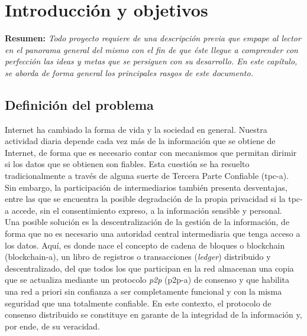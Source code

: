 \documentclass[12pt,a4paper, twoside]{report}
\begin{document}
	\setlength{\headwidth}{17.5cm}
	\renewcommand{\headrulewidth}{1.3pt}
	\setlength{\headsep}{1.1cm}
	
	\chapter{Introducción y objetivos} \label{introductionChapter}
		
	
	\textbf{Resumen:} \textit{Todo proyecto requiere de una descripción previa que empape al lector en el panorama general del mismo con el fin de que éste llegue a comprender con perfección las ideas y metas que se persiguen con su desarrollo. En este capítulo, se aborda de forma general los principales rasgos de este documento.}
		
	\section{Definición del problema}
		
	Internet ha cambiado la forma de vida y la sociedad en general. Nuestra actividad diaria depende cada vez más de la información que se obtiene de Internet, de forma que es necesario contar con mecanismos que permitan dirimir si los datos que se obtienen son fiables. Esta cuestión se ha resuelto tradicionalmente a través de alguna suerte de Tercera Parte Confiable (\gls{tpc-a}). Sin embargo, la participación de intermediarios también presenta desventajas, entre las que se encuentra la posible degradación de la propia privacidad si la \gls{tpc-a} accede, sin el consentimiento expreso, a la información sensible y personal. \\
	
	Una posible solución es la descentralización de la gestión de la información, de forma que no es necesario una autoridad central intermediaria que tenga acceso a los datos. Aquí, es donde nace el concepto de cadena de bloques o \Gls{blockchain} (\gls{blockchain-a}), un libro de registros o transacciones (\textit{ledger}) distribuido y descentralizado, del que todos los que participan en la red almacenan una copia que se actualiza mediante un protocolo \textit{\gls{p2p}} (\gls{p2p-a}) de consenso y que habilita una red a priori sin confianza a ser completamente funcional y con la misma seguridad que una totalmente confiable. En este contexto, el protocolo de consenso distribuido se constituye en garante de la integridad de la información y, por ende, de su veracidad. \\
\end{document}
